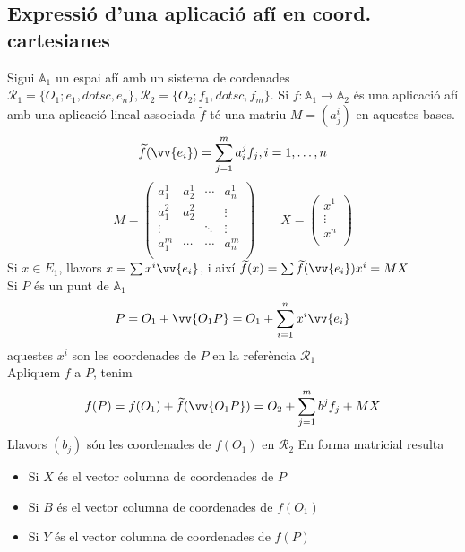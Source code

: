 \subsection{Expressió d'una aplicació afí en coord. cartesianes}
\label{ss_apcoca}

Sigui $\mathbb{A}_1$ un espai afí amb un sistema de cordenades $\mathcal{R}_1=\{O_1;e_1,dotsc ,e_n\},\mathcal{R}_2=\{O_2;f_1,dotsc ,f_m\}$. Si $f:\mathbb{A}_1\to\mathbb{A}_2$ és una aplicació afí amb una aplicació lineal associada $\widetilde{f}$ té una matriu $M=(a_j^i)$ en aquestes bases.
\[\widetilde{f}(\vv{e_i})=\sum\limits_{j=1}^ma_i^jf_j,i=1,\dotsc ,n\]
\[M=\left(\begin{array}{cccc}
	a_1^1&a_2^1&\cdots&a_n^1\\
	a_1^2&a_2^2& &\vdots\\
	\vdots& &\ddots&\vdots\\
	a_1^m&\cdots&\cdots&a_n^m\\
\end{array}\right)\hspace{2em}X=\left(\begin{array}{c}
	x^1\\
	\vdots\\
	x^n\\
\end{array}\right)\]
Si $x\in E_1$, llavors $x=\sum x^i\vv{e_i}$, i així $\widetilde{f}(x)=\sum\widetilde{f}(\vv{e_i})x^i=MX$ \\
Si $P$ és un punt de $\mathbb{A}_1$
\[P=O_1+\vv{O_1P}=O_1+\sum\limits_{i=1}^nx^i\vv{e_i}\]
aquestes $x^i$ son les coordenades de $P$ en la referència $\mathcal{R}_1$ \\
Apliquem $f$ a $P$, tenim
\[f(P)=f(O_1)+\widetilde{f}(\vv{O_1P})=O_2+\sum\limits_{j=1}^mb^jf_j+MX\]
Llavors $(b_j)$ són les coordenades de $f(O_1)$ en $\mathcal{R}_2$
En forma matricial resulta
\begin{itemize}
	\item Si $X$ és el vector columna de coordenades de $P$
	\item Si $B$ és el vector columna de coordenades de $f(O_1)$
	\item Si $Y$ és el vector columna de coordenades de $f(P)$
\end{itemize}
